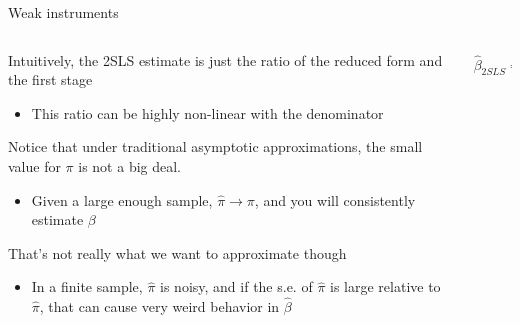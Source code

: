 \documentclass[notes,11pt, aspectratio=169]{beamer}
\newenvironment{wideitemize}{\itemize\addtolength{\itemsep}{10pt}}{\enditemize}
\begin{document}
\begin{frame}{Weak instruments}
  \begin{columns}[T] %
    \begin{column}{0.7\textwidth}
  \begin{wideitemize}
  \item Intuitively, the 2SLS estimate is just the ratio of the reduced form and the first stage
    \begin{itemize}
    \item This ratio can be highly non-linear with the denominator
    \end{itemize}
  \item Notice that under traditional asymptotic approximations, the
    small value for $\pi$ is not a big deal.
    \begin{itemize}
    \item Given a large enough sample, $\hat{\pi} \to \pi$, and you
      will consistently estimate $\beta$
    \end{itemize}
  \item That's not really what we want to approximate though
    \begin{itemize}
    \item In a finite sample, $\hat{\pi}$ is noisy, and if the
    s.e. of $\hat{\pi}$ is large relative to $\hat{\pi}$, that can
    cause very weird behavior in $\hat{\beta}$
    \end{itemize}
  \end{wideitemize}
\end{column}
\begin{column}{0.3\textwidth}
      \begin{align*}
      \hat{\beta}_{2SLS} = \frac{\hat{\delta}}{\hat{\pi}}
    \end{align*}

\end{column}
\end{columns}
\end{frame}
\end{document}
